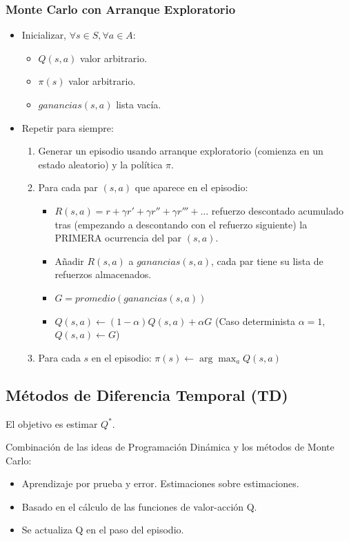 \documentclass[12pt, twoside, openright]{report} %
\begin{document}
\subsubsection{Monte Carlo con Arranque Exploratorio}
\begin{itemize}
  \item Inicializar, $\forall s \in S, \forall a \in A$:
  \begin{itemize}
    \item $Q(s, a)$ valor arbitrario.
    \item $\pi(s)$ valor arbitrario.
    \item $ganancias(s, a)$ lista vacía.
  \end{itemize}
  \item Repetir para siempre:
  \begin{enumerate}
    \item Generar un episodio usando arranque exploratorio (comienza en un estado aleatorio) y la política $\pi$.
    \item Para cada par $(s, a)$ que aparece en el episodio:
    \begin{itemize}
      \item $R(s, a) = r + \gamma r'+ \gamma r''+ \gamma r'''+\dots$ refuerzo descontado acumulado tras (empezando a descontando con el refuerzo siguiente) la PRIMERA ocurrencia del par $(s, a)$. 
      \item Añadir $R(s, a)$ a $ganancias(s, a)$, cada par tiene su lista de refuerzos almacenados.
      \item $G = promedio(ganancias(s, a))$
      \item $Q(s, a) \leftarrow (1-\alpha)Q(s, a) + \alpha G$ (Caso determinista $\alpha = 1$, $Q(s, a) \leftarrow G$)
    \end{itemize}
    \item Para cada $s$ en el episodio: $\pi(s) \leftarrow \arg \max_a Q(s, a)$
  \end{enumerate}
\end{itemize}

\subsection{Métodos de Diferencia Temporal (TD)}
El objetivo es estimar $Q^*$.

Combinación de las ideas de Programación Dinámica y los métodos de Monte Carlo:
\begin{itemize}
  \item Aprendizaje por prueba y error. Estimaciones sobre estimaciones.
  \item Basado en el cálculo de las funciones de valor-acción Q.
  \item Se actualiza Q en el paso del episodio.
\end{itemize}
\end{document}

